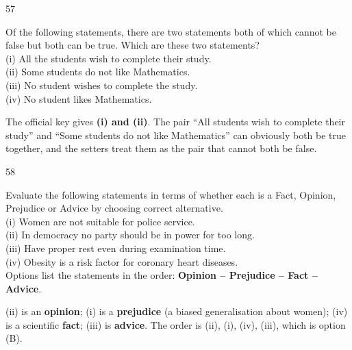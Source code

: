 \begin{question}{57}
{Of the following statements, there are two statements both of which cannot be false but both can be true. Which are these two statements?\\
(i) All the students wish to complete their study.\\
(ii) Some students do not like Mathematics.\\
(iii) No student wishes to complete the study.\\
(iv) No student likes Mathematics.\par}
\begin{explain}
The official key gives \textbf{(i) and (ii)}. The pair ``All students wish to complete their study'' and ``Some students do not like Mathematics'' can obviously both be true together, and the setters treat them as the pair that cannot both be false.
\end{explain}
\end{question}

\begin{question}{58}
{Evaluate the following statements in terms of whether each is a Fact, Opinion, Prejudice or Advice by choosing correct alternative.\\
(i) Women are not suitable for police service.\\
(ii) In democracy no party should be in power for too long.\\
(iii) Have proper rest even during examination time.\\
(iv) Obesity is a risk factor for coronary heart diseases.\\
Options list the statements in the order: \textbf{Opinion -- Prejudice -- Fact -- Advice}.\par}
\begin{explain}
(ii) is an \textbf{opinion}; (i) is a \textbf{prejudice} (a biased generalisation about women); (iv) is a scientific \textbf{fact}; (iii) is \textbf{advice}. The order is (ii), (i), (iv), (iii), which is option (B).
\end{explain}
\end{question}

